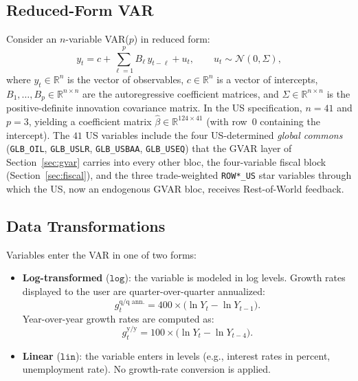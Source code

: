 \documentclass[11pt]{article}
\newcommand{\R}{\mathbb{R}}
\theoremstyle{definition}
\theoremstyle{remark}
\begin{document}
\subsection{Reduced-Form VAR}

Consider an $n$-variable VAR($p$) in reduced form:
\begin{equation}\label{eq:var}
  y_t = c + \sum_{\ell=1}^{p} B_\ell\, y_{t-\ell} + u_t,
  \qquad u_t \sim \mathcal{N}(0, \Sigma),
\end{equation}
where $y_t \in \R^n$ is the vector of observables, $c \in \R^n$ is a
vector of intercepts, $B_1, \ldots, B_p \in \R^{n \times n}$ are the
autoregressive coefficient matrices, and $\Sigma \in \R^{n \times n}$
is the positive-definite innovation covariance matrix.  In the US
specification, $n = 41$ and $p = 3$, yielding a coefficient matrix
$\hat\beta \in \R^{124 \times 41}$ (with row~0 containing the
intercept).  The $41$ US variables include the four US-determined
\emph{global commons} (\texttt{GLB\_OIL}, \texttt{GLB\_USLR},
\texttt{GLB\_USBAA}, \texttt{GLB\_USEQ}) that the GVAR layer of
Section~\ref{sec:gvar} carries into every other bloc, the four-variable fiscal
block (Section~\ref{sec:fiscal}), and the three trade-weighted \texttt{ROW*\_US}
star variables through which the US, now an endogenous GVAR bloc, receives
Rest-of-World feedback.

\subsection{Data Transformations}

Variables enter the VAR in one of two forms:
\begin{itemize}
  \item \textbf{Log-transformed} ($\texttt{log}$): the variable is
    modeled in log levels.  Growth rates displayed to the user are
    quarter-over-quarter annualized:
    \begin{equation}\label{eq:growth}
      g_t^{\text{q/q ann.}} = 400 \times
      \bigl(\ln Y_t - \ln Y_{t-1}\bigr).
    \end{equation}
    Year-over-year growth rates are computed as:
    \begin{equation}\label{eq:yoy}
      g_t^{\text{y/y}} = 100 \times
      \bigl(\ln Y_t - \ln Y_{t-4}\bigr).
    \end{equation}
  \item \textbf{Linear} ($\texttt{lin}$): the variable enters in
    levels (e.g., interest rates in percent, unemployment rate).
    No growth-rate conversion is applied.
\end{itemize}
\end{document}
